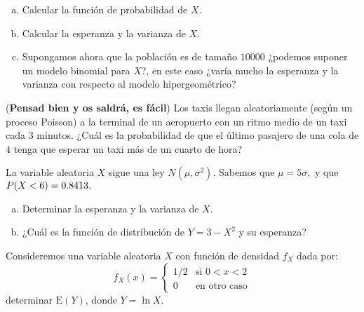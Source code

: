 \documentclass[12pt]{article}
\begin{document}
\begin{enumerate}[a)]
\item Calcular la función de probabilidad de $X$.
\item Calcular la esperanza y la varianza de $X$.
\item Supongamos ahora que la población es de tamaño $10000$ ¿podemos suponer un modelo
binomial para $X$?, en este caso ¿varía mucho la esperanza y la varianza con respecto al
modelo hipergeométrico?
\end{enumerate}




\probl (\textbf{Pensad bien y os saldrá, es fácil}) Los taxis llegan aleatoriamente (según un proceso Poisson) a la terminal de un
aeropuerto con un ritmo medio de un taxi cada $3$ minutos. ¿Cuál es la probabilidad de que
el último pasajero de una cola de $4$ tenga que esperar un taxi más de un cuarto de hora?





\probl  La variable aleatoria $X$ sigue una ley  $\displaystyle N(\mu, \sigma^2). $ Sabemos
que   $ \mu = 5  \sigma, $ y  que $ P(X < 6) = 0.8413.$

\begin{enumerate}[a)]
\item Determinar la esperanza y la varianza de $X$.
\item ¿Cuál es la función de distribución de $ Y = 3
- X^2  $ y su esperanza? 
\end{enumerate}





\probl  Consideremos una variable aleatoria $X$ con función de densidad $f_X$ dada por:
$$f_X(x) = \left\{\begin{array}{ll}
1/2 & \mbox{si }  0<x<2\\ 0 & \mbox{en otro caso}\end{array}\right.$$
 determinar
$\mathrm{E}( Y)$, donde $Y= \ln X.$ 
\end{document}
